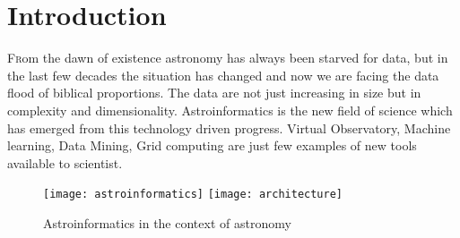 \chapter*{Introduction}


\renewcommand{\LettrineFontHook}{\color{red}}


\lettrine[lines = 3, loversize=-0.1, lraise=0.1]{F}rom the dawn of existence astronomy has always been starved for
data, but in the last few decades the situation has changed and now we
are facing the data flood of biblical proportions. The data are not
just increasing in size but in complexity and
dimensionality. \cite{ballastroinformatics} Astroinformatics is the
new field of science which has emerged from this technology driven
progress.  Virtual Observatory, Machine learning, Data Mining, Grid
computing are just few examples of new tools available to
scientist. 



\vspace{10pt}
\begin{figure}[!htbp]
  \begin{center}
    \leavevmode
    \ifpdf
    \texttt{[image: astroinformatics]}
    \else
    \texttt{[image: architecture]}
    \fi
    \caption{Astroinformatics in the context of astronomy \cite{ballastroinformatics} }
    \label{FigAir}
  \end{center}
\end{figure}
\vspace{-10pt}



